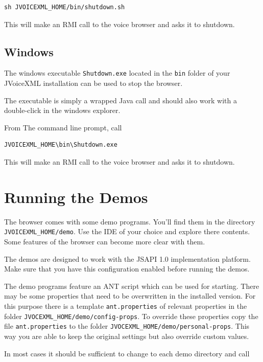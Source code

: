 \documentclass[11pt,a4paper]{article}
\begin{document}
\begin{lstlisting}
sh JVOICEXML_HOME/bin/shutdown.sh
\end{lstlisting}

This will make an RMI call to the voice browser and asks it to shutdown.

\subsection{Windows}

The windows executable \texttt{Shutdown.exe} located in the \texttt{bin}
folder of your JVoiceXML installation can be used to stop the browser.

The executable is simply a wrapped Java call and should also work with a
double-click in the windows explorer.

From The command line prompt, call

\begin{lstlisting}
JVOICEXML_HOME\bin\Shutdown.exe
\end{lstlisting}

This will make an RMI call to the voice browser and asks it to shutdown.

\section{Running the Demos}

The browser comes with some demo programs. You'll find them in the
directory \texttt{JVOICEXML\_HOME/demo}. Use the IDE of your choice
and explore there contents. Some features of the browser can 
become more clear with them.

The demos are designed to work with the JSAPI 1.0 implementation platform. Make
sure that you have this configuration enabled before running the demos.

The demo programs feature an ANT script which can be used for starting.
There may be some properties that need to be overwritten in the installed
version. For this purpose there is a template \lstinline{ant.properties} of
relevant properties in the folder \lstinline{JVOCEXML_HOME/demo/config-props}.
To override these properties copy the file \texttt{ant.properties} to the
folder \lstinline{JVOCEXML_HOME/demo/personal-props}. This way you are able
to keep the original settings but also override custom values.

In most cases it should be sufficient to change to each demo directory
and call
\end{document}

